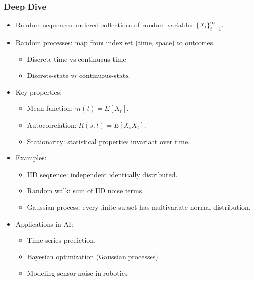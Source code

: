 \documentclass[
  letterpaper,
  DIV=11,
  numbers=noendperiod]{scrreprt}
\providecommand{\tightlist}{%
  \setlength{\itemsep}{0pt}\setlength{\parskip}{0pt}}
\begin{document}
\subsubsection{Deep Dive}\label{deep-dive-190}

\begin{itemize}
\item
  Random sequences: ordered collections of random variables
  \(\{X_t\}_{t=1}^\infty\).
\item
  Random processes: map from index set (time, space) to outcomes.

  \begin{itemize}
  \tightlist
  \item
    Discrete-time vs continuous-time.
  \item
    Discrete-state vs continuous-state.
  \end{itemize}
\item
  Key properties:

  \begin{itemize}
  \tightlist
  \item
    Mean function: \(m(t) = E[X_t]\).
  \item
    Autocorrelation: \(R(s,t) = E[X_s X_t]\).
  \item
    Stationarity: statistical properties invariant over time.
  \end{itemize}
\item
  Examples:

  \begin{itemize}
  \tightlist
  \item
    IID sequence: independent identically distributed.
  \item
    Random walk: sum of IID noise terms.
  \item
    Gaussian process: every finite subset has multivariate normal
    distribution.
  \end{itemize}
\item
  Applications in AI:

  \begin{itemize}
  \tightlist
  \item
    Time-series prediction.
  \item
    Bayesian optimization (Gaussian processes).
  \item
    Modeling sensor noise in robotics.
  \end{itemize}
\end{itemize}
\end{document}
